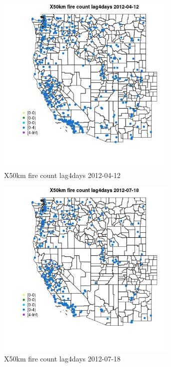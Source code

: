 \begin{figure} 
\centering  
\includegraphics[width=0.77\textwidth]{Code_Outputs/Report_ML_input_PM25_Step4_part_e_de_duplicated_aves_compiled_2019-05-14wNAs_MapObsX50km_fire_count_lag4days2012-04-12.jpg} 
\caption{\label{fig:Report_ML_input_PM25_Step4_part_e_de_duplicated_aves_compiled_2019-05-14wNAsMapObsX50km_fire_count_lag4days2012-04-12}X50km fire count lag4days 2012-04-12} 
\end{figure} 
 

\clearpage 

\begin{figure} 
\centering  
\includegraphics[width=0.77\textwidth]{Code_Outputs/Report_ML_input_PM25_Step4_part_e_de_duplicated_aves_compiled_2019-05-14wNAs_MapObsX50km_fire_count_lag4days2012-07-18.jpg} 
\caption{\label{fig:Report_ML_input_PM25_Step4_part_e_de_duplicated_aves_compiled_2019-05-14wNAsMapObsX50km_fire_count_lag4days2012-07-18}X50km fire count lag4days 2012-07-18} 
\end{figure} 
 

